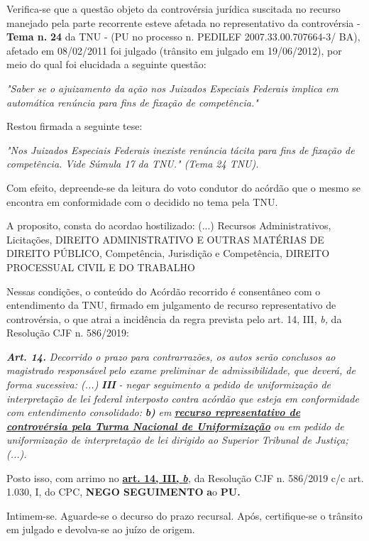 \documentclass[12pt]{article}
\begin{document}
\justifying
\noindent Verifica-se que a questão objeto da controvérsia jurídica suscitada no recurso manejado pela parte recorrente esteve afetada no representativo da controvérsia - \textbf{Tema n. }\textbf{24} da TNU - (PU no processo n. PEDILEF 2007.33.00.707664-3/ BA),  afetado em 08/02/2011 foi julgado (trânsito em julgado em 19/06/2012), por meio do qual foi elucidada a seguinte questão:

\noindent \textit{"Saber se o ajuizamento da ação nos Juizados Especiais Federais implica em automática renúncia para fins de fixação de competência."}

\noindent Restou firmada a seguinte tese:

\noindent \textit{"Nos Juizados Especiais Federais inexiste renúncia tácita para fins de fixação de competência. Vide Súmula 17 da TNU." (Tema 24 TNU).}

\noindent Com efeito, depreende-se da leitura do voto condutor do acórdão que o mesmo se encontra em conformidade com o decidido no  tema pela TNU.

\noindent A proposito, consta do acordao hostilizado: (...) Recursos Administrativos, Licitações, DIREITO ADMINISTRATIVO E OUTRAS MATÉRIAS DE DIREITO PÚBLICO, Competência, Jurisdição e Competência, DIREITO PROCESSUAL CIVIL E DO TRABALHO

\noindent Nessas condições, o conteúdo do Acórdão recorrido é consentâneo com o entendimento da TNU, firmado em julgamento de recurso representativo de controvérsia, o que atrai a incidência da regra prevista pelo art. 14, III, \textit{b,} da Resolução CJF n. 586/2019:

\noindent \textit{\textbf{Art. 14.}}\textit{ Decorrido o prazo para contrarrazões, os autos serão conclusos ao magistrado responsável pelo exame preliminar de admissibilidade, que deverá, de forma sucessiva: (...) }\textit{\textbf{III }}\textit{- negar seguimento a pedido de uniformização de interpretação de lei federal interposto contra acórdão que esteja em conformidade com entendimento consolidado: }\textit{\textbf{b)}}\textit{ em }\uline{\textit{\textbf{recurso representativo de controvérsia pela Turma Nacional de Uniformização}}}\textit{ ou em pedido de uniformização de interpretação de lei dirigido ao Superior Tribunal de Justiça;(...).}

\noindent Posto isso, com arrimo no \uline{\textbf{art. 14, III, }}\uline{\textit{\textbf{b}}}\textit{,} da Resolução CJF n. 586/2019 c/c art. 1.030, I, do CPC, \textbf{NEGO SEGUIMENTO }\textbf{a}o\textbf{ PU}\textbf{.}

\noindent Intimem-se. Aguarde-se o decurso do prazo recursal. Após, certifique-se o trânsito em julgado e devolva-se ao juízo de origem.
\end{document}
